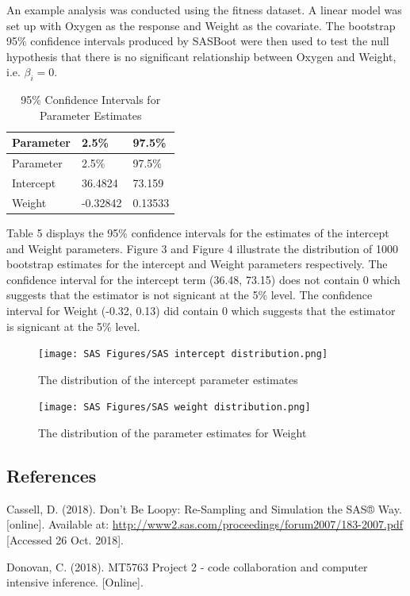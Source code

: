 \documentclass[]{article}
\begin{document}
An example analysis was conducted using the fitness dataset. A linear
model was set up with Oxygen as the response and Weight as the
covariate. The bootstrap 95\% confidence intervals produced by SASBoot
were then used to test the null hypothesis that there is no significant
relationship between Oxygen and Weight, i.e. \(\beta_i = 0\).

\begin{longtable}[]{@{}lll@{}}
\caption{95\% Confidence Intervals for Parameter
Estimates}\tabularnewline
\toprule
Parameter & 2.5\% & 97.5\%\tabularnewline
\midrule
\endfirsthead
\toprule
Parameter & 2.5\% & 97.5\%\tabularnewline
\midrule
\endhead
Intercept & 36.4824 & 73.159\tabularnewline
Weight & -0.32842 & 0.13533\tabularnewline
\bottomrule
\end{longtable}

Table 5 displays the 95\% confidence intervals for the estimates of the
intercept and Weight parameters. Figure 3 and Figure 4 illustrate the
distribution of 1000 bootstrap estimates for the intercept and Weight
parameters respectively. The confidence interval for the intercept term
(36.48, 73.15) does not contain 0 which suggests that the estimator is
not signicant at the 5\% level. The confidence interval for Weight
(-0.32, 0.13) did contain 0 which suggests that the estimator is
signicant at the 5\% level.

\begin{figure}
\centering
\texttt{[image: SAS Figures/SAS intercept distribution.png]}
\caption{The distribution of the intercept parameter estimates}
\end{figure}

\begin{figure}
\centering
\texttt{[image: SAS Figures/SAS weight distribution.png]}
\caption{The distribution of the parameter estimates for Weight}
\end{figure}

\pagebreak 

\subsection{References}\label{references}

Cassell, D. (2018). Don't Be Loopy: Re-Sampling and Simulation the SAS®
Way. {[}online{]}. Available at:
\url{http://www2.sas.com/proceedings/forum2007/183-2007.pdf} {[}Accessed
26 Oct. 2018{]}.

Donovan, C. (2018). MT5763 Project 2 - code collaboration and computer
intensive inference. {[}Online{]}.
\end{document}
